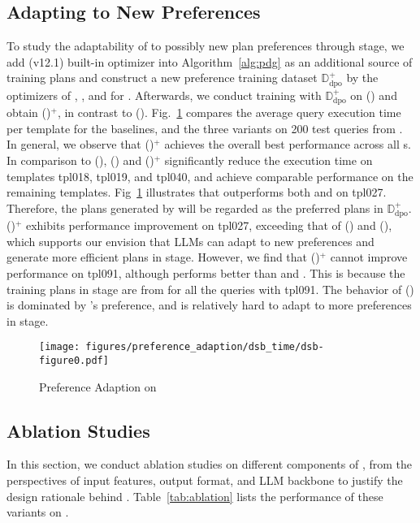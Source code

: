 \subsection{Adapting to New Preferences}
\label{sec:exp:preference adaption}
To study the adaptability of \LLMQO to possibly new plan preferences through \QDPO stage, we add \db (v12.1) built-in optimizer into Algorithm~\ref{alg:pdg} as an additional source of training plans and construct a new preference training dataset $\mathbb{D}_\mathrm{dpo}^+$ by the optimizers of \Postgres, \Oracle, and  \db  for \dsb. 
Afterwards, we conduct \QDPO training with $\mathbb{D}_\mathrm{dpo}^+$ on \LLMQO (\QIT) and obtain \LLMQO (\QDPO)$^{+}$, in contrast to \LLMQO (\QDPO). 
Fig.~\ref{fig:exp:preference_adaption} compares the average query execution time per template for  the baselines, and the three \LLMQO variants on 200 test queries from \dsb.
%
In general, we observe that \LLMQO (\QDPO)$^{+}$ achieves the overall best performance across all {\LLMQO}s.
In comparison to \LLMQO (\QIT), \LLMQO (\QDPO) and \LLMQO (\QDPO)$^{+}$ significantly reduce
the execution time on templates tpl018, tpl019, and tpl040, and achieve comparable performance on the remaining templates. 
%
Fig~\ref{fig:exp:preference_adaption} illustrates that \db outperforms both \Postgres and \Oracle on tpl027. Therefore, the plans generated by \db will be regarded as the preferred plans in $\mathbb{D}_\mathrm{dpo}^+$. \LLMQO (\QDPO)$^{+}$ exhibits performance improvement on tpl027, exceeding that of \LLMQO (\QIT) and \LLMQO (\QDPO), which supports our envision that LLMs can adapt to new preferences and generate more efficient plans in \QDPO stage.
%
However, we find that \LLMQO (\QDPO)$^{+}$ cannot improve  performance on tpl091, although \db performs better than \Postgres and \Oracle.
This is because the training plans in \QIT stage are from \Oracle for all the queries with tpl091. The behavior of \LLMQO (\QIT) is dominated by \Oracle's preference, and is relatively hard to adapt to more preferences in \QDPO stage. 

\begin{figure}
  \centering
 \texttt{[image: figures/preference\_adaption/dsb\_time/dsb-figure0.pdf]}
  \caption{Preference Adaption on \dsb}
  \vspace{-2ex}
\label{fig:exp:preference_adaption}
\end{figure}
\subsection{Ablation Studies}
\label{sec:exp:ablation}
In this section, we conduct ablation studies on different components of \LLMQO, from the perspectives of input features, output format, and LLM backbone to justify the design rationale behind \LLMQO. Table~\ref{tab:ablation} lists the performance of these \LLMQO variants on \dsb.

